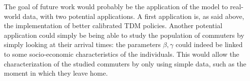 The goal of future work would probably be the application of the model to real-world data,
with two potential applications.
A first application is, as said above, the implementation of better calibrated TDM policies.
Another potential application could simply be being able to study the population of commuters by simply looking at their arrival times:
the parameters \(\beta, \gamma\) could indeed be linked to some socio-economic characteristics of the individuals.
This would allow the characterization of the studied commuters by only using simple data,
such as the moment in which they leave home.

